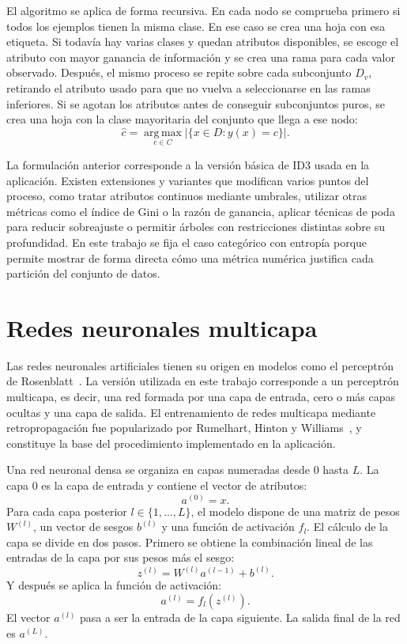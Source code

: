 El algoritmo se aplica de forma recursiva.
En cada nodo se comprueba primero si todos los ejemplos tienen la misma clase.
En ese caso se crea una hoja con esa etiqueta.
Si todavía hay varias clases y quedan atributos disponibles, se escoge el atributo con mayor ganancia de información y se crea una rama para cada valor observado.
Después, el mismo proceso se repite sobre cada subconjunto \(D_v\), retirando el atributo usado para que no vuelva a seleccionarse en las ramas inferiores.
Si se agotan los atributos antes de conseguir subconjuntos puros, se crea una hoja con la clase mayoritaria del conjunto que llega a ese nodo:
\[
\hat{c} = \operatorname*{arg\,max}_{c \in C} |\{x \in D : y(x)=c\}|.
\]

La formulación anterior corresponde a la versión básica de ID3 usada en la aplicación.
Existen extensiones y variantes que modifican varios puntos del proceso, como tratar atributos continuos mediante umbrales, utilizar otras métricas como el índice de Gini o la razón de ganancia, aplicar técnicas de poda para reducir sobreajuste o permitir árboles con restricciones distintas sobre su profundidad.
En este trabajo se fija el caso categórico con entropía porque permite mostrar de forma directa cómo una métrica numérica justifica cada partición del conjunto de datos.


\section{Redes neuronales multicapa}
\label{sec:marco_redes_neuronales}

Las redes neuronales artificiales tienen su origen en modelos como el perceptrón de Rosenblatt~\cite{RosenblattPerceptron}.
La versión utilizada en este trabajo corresponde a un perceptrón multicapa, es decir, una red formada por una capa de entrada, cero o más capas ocultas y una capa de salida.
El entrenamiento de redes multicapa mediante retropropagación fue popularizado por Rumelhart, Hinton y Williams~\cite{RumelhartBackprop}, y constituye la base del procedimiento implementado en la aplicación.

Una red neuronal densa se organiza en capas numeradas desde \(0\) hasta \(L\).
La capa \(0\) es la capa de entrada y contiene el vector de atributos:
\[
a^{(0)} = x.
\]
Para cada capa posterior \(l \in \{1, \dots, L\}\), el modelo dispone de una matriz de pesos \(W^{(l)}\), un vector de sesgos \(b^{(l)}\) y una función de activación \(f_l\).
El cálculo de la capa se divide en dos pasos.
Primero se obtiene la combinación lineal de las entradas de la capa por sus pesos más el sesgo:
\[
z^{(l)} = W^{(l)}a^{(l-1)} + b^{(l)}.
\]
Y después se aplica la función de activación:
\[
a^{(l)} = f_l\left(z^{(l)}\right).
\]
El vector \(a^{(l)}\) pasa a ser la entrada de la capa siguiente.
La salida final de la red es \(a^{(L)}\).

